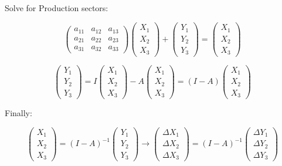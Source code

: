 \documentclass[
  letterpaper,
  DIV=11,
  numbers=noendperiod]{scrartcl}
\begin{document}
\subsection{}\label{section-4}

Solve for Production sectors:

\[
\begin{pmatrix}
a_{11} & a_{12} & a_{13}  \\
a_{21} & a_{22} & a_{23} \\
a_{31} & a_{32} & a_{33} 
\end{pmatrix}
\begin{pmatrix}
X_1 \\ X_2 \\ X_3 
\end{pmatrix} + 
\begin{pmatrix}
Y_1 \\ Y_2 \\ Y_3 
\end{pmatrix}=
\begin{pmatrix}
X_1 \\ X_2 \\ X_3 
\end{pmatrix}
\]

\[
\begin{pmatrix}
Y_1 \\ Y_2 \\ Y_3 
\end{pmatrix}=I \begin{pmatrix} X_1 \\ X_2 \\ X_3 \end{pmatrix} -
A \begin{pmatrix} X_1 \\ X_2 \\ X_3 \end{pmatrix} = (I-A) \begin{pmatrix} X_1 \\ X_2 \\ X_3 \end{pmatrix}
\]

Finally:

\[
\begin{pmatrix} X_1 \\ X_2 \\ X_3 \end{pmatrix} = (I-A)^{-1} \begin{pmatrix} Y_1 \\ Y_2 \\ Y_3 \end{pmatrix}
\rightarrow 
\begin{pmatrix} \Delta X_1 \\ \Delta X_2 \\ \Delta X_3 \end{pmatrix} = (I-A)^{-1}
\begin{pmatrix} \Delta Y_1 \\ \Delta Y_2 \\ \Delta Y_3 \end{pmatrix}
\]
\end{document}

